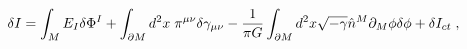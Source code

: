 \begin{equation}
\delta I=\int_{M}E_{I}\delta \Phi ^{I}+\int_{\partial M}d^{2}x\;\pi ^{\mu
\nu }\delta \gamma _{\mu \nu }-\frac{1}{\pi G}\int_{\partial M}d^{2}x\sqrt{%
-\gamma }\hat{n}^{M}\partial _{M}\phi \delta \phi +\delta I_{ct}\;,
\label{Delta I0}
\end{equation}

